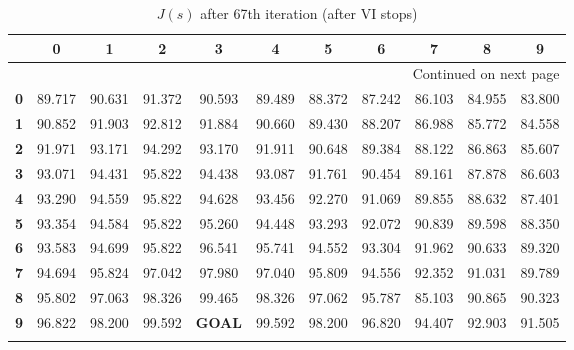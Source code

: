 \documentclass{article}
\begin{document}
\begin{longtable}{|c|c|c|c|c|c|c|c|c|c|c|}
\toprule
{} &       0 &       1 &       2 &       3 &       4 &       5 &       6 &       7 &       8 &       9 \\
\midrule
\endhead
\midrule
\multicolumn{11}{r}{{Continued on next page}} \\
\midrule
\endfoot

\bottomrule
\endlastfoot
\textbf{0} &  89.717 &  90.631 &  91.372 &  90.593 &  89.489 &  88.372 &  87.242 &  86.103 &  84.955 &  83.800 \\\hline
\textbf{1} &  90.852 &  91.903 &  92.812 &  91.884 &  90.660 &  89.430 &  88.207 &  86.988 &  85.772 &  84.558 \\\hline
\textbf{2} &  91.971 &  93.171 &  94.292 &  93.170 &  91.911 &  90.648 &  89.384 &  88.122 &  86.863 &  85.607 \\\hline
\textbf{3} &  93.071 &  94.431 &  95.822 &  94.438 &  93.087 &  91.761 &  90.454 &  89.161 &  87.878 &  86.603 \\\hline
\textbf{4} &  93.290 &  94.559 &  95.822 &  94.628 &  93.456 &  92.270 &  91.069 &  89.855 &  88.632 &  87.401 \\\hline
\textbf{5} &  93.354 &  94.584 &  95.822 &  95.260 &  94.448 &  93.293 &  92.072 &  90.839 &  89.598 &  88.350 \\\hline
\textbf{6} &  93.583 &  94.699 &  95.822 &  96.541 &  95.741 &  94.552 &  93.304 &  91.962 &  90.633 &  89.320 \\\hline
\textbf{7} &  94.694 &  95.824 &  97.042 &  97.980 &  97.040 &  95.809 &  94.556 &  92.352 &  91.031 &  89.789 \\\hline
\textbf{8} &  95.802 &  97.063 &  98.326 &  99.465 &  98.326 &  97.062 &  95.787 &  85.103 &  90.865 &  90.323 \\\hline
\textbf{9} &  96.822 &  98.200 &  99.592 &   \textbf{GOAL} &  99.592 &  98.200 &  96.820 &  94.407 &  92.903 &  91.505 \\\hline
\caption{$J(s)$ after 67th iteration (after VI stops)}
\end{longtable}
\end{document}
